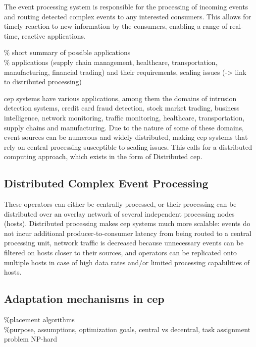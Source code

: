 The event processing system is responsible for the processing of incoming events and routing detected complex events to any interested consumers.
This allows for timely reaction to new information by the consumers, enabling a range of real-time, reactive applications.

\% short summary of possible applications \\
\% applications (supply chain management, healthcare, transportation, manufacturing, financial trading) and their requirements, scaling issues (-> link to distributed processing)

\gls{cep} systems have various applications, among them the  domains of intrusion detection systems, credit card fraud detection, stock market trading, business intelligence, network monitoring, traffic monitoring, healthcare, transportation, supply chains and manufacturing. Due to the nature of some of these domains, event sources can be numerous and widely distributed, making \gls{cep} systems that rely on central processing susceptible to scaling issues. This calls for a distributed computing approach, which exists in the form of Distributed \gls{cep}.

\subsection{Distributed Complex Event Processing}

These operators can either be centrally processed, or their processing can be distributed over an overlay network of several independent processing nodes (hosts). Distributed processing makes \gls{cep} systems much more scalable: events do not incur additional producer-to-consumer latency from being routed to a central processing unit, network traffic is decreased because unnecessary events can be filtered on hosts closer to their sources, and operators can be replicated onto multiple hosts in case of high data rates and/or limited processing capabilities of hosts.



\subsection{Adaptation mechanisms in \gls{cep}}
\%placement algorithms \\
\%purpose, assumptions, optimization goals, central vs decentral, task assignment problem NP-hard

